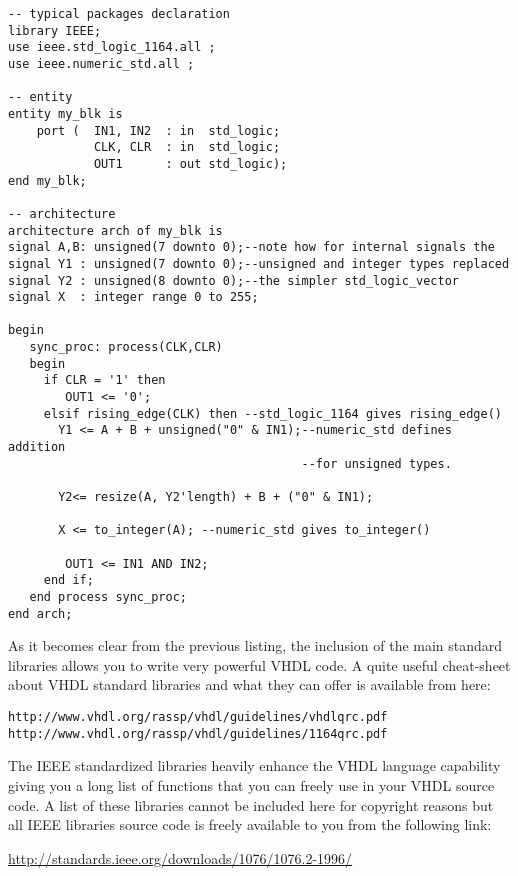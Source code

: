 \noindent
\begin{minipage}{0.99\linewidth}
\begin{lstlisting}[label=good_lib_ex, caption=Example of operators and types available with some IEEE packages.]
-- typical packages declaration
library IEEE;
use ieee.std_logic_1164.all ;
use ieee.numeric_std.all ;

-- entity
entity my_blk is 
    port (  IN1, IN2  : in  std_logic;
            CLK, CLR  : in  std_logic; 
            OUT1      : out std_logic); 
end my_blk;

-- architecture
architecture arch of my_blk is
signal A,B: unsigned(7 downto 0);--note how for internal signals the
signal Y1 : unsigned(7 downto 0);--unsigned and integer types replaced
signal Y2 : unsigned(8 downto 0);--the simpler std_logic_vector
signal X  : integer range 0 to 255;

begin
   sync_proc: process(CLK,CLR)
   begin
     if CLR = '1' then 
        OUT1 <= '0';  
     elsif rising_edge(CLK) then --std_logic_1164 gives rising_edge()
       Y1 <= A + B + unsigned("0" & IN1);--numeric_std defines addition
                                         --for unsigned types.

       Y2<= resize(A, Y2'length) + B + ("0" & IN1);
  
       X <= to_integer(A); --numeric_std gives to_integer()

        OUT1 <= IN1 AND IN2; 
     end if; 
   end process sync_proc; 
end arch;
\end{lstlisting}
\end{minipage}

As it becomes clear from the previous listing, the inclusion of the main standard libraries allows you to write very powerful VHDL code. A quite useful cheat-sheet about VHDL standard libraries and what they can offer is available from here:

\noindent
\begin{verbatim}
http://www.vhdl.org/rassp/vhdl/guidelines/vhdlqrc.pdf
http://www.vhdl.org/rassp/vhdl/guidelines/1164qrc.pdf
\end{verbatim}

The IEEE standardized libraries heavily enhance the VHDL language capability giving you a long list of functions that you can freely use in your VHDL source code. A list of these libraries cannot be included here for copyright reasons but all IEEE libraries source code is freely available to you from the following link:

\noindent
\url{http://standards.ieee.org/downloads/1076/1076.2-1996/}

